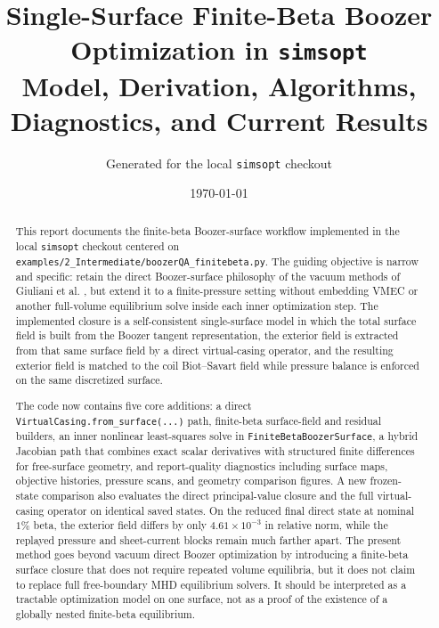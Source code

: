 \documentclass[11pt]{article}
\title{Single-Surface Finite-Beta Boozer Optimization in \texttt{simsopt}\\Model, Derivation, Algorithms, Diagnostics, and Current Results}
\author{Generated for the local \texttt{simsopt} checkout}
\date{\today}
\begin{document}
\maketitle

\begin{abstract}
This report documents the finite-beta Boozer-surface workflow implemented in the local \texttt{simsopt} checkout centered on \texttt{examples/2\_Intermediate/boozerQA\_finitebeta.py}. The guiding objective is narrow and specific: retain the direct Boozer-surface philosophy of the vacuum methods of Giuliani et al. \cite{Giuliani2022,Giuliani2023}, but extend it to a finite-pressure setting without embedding VMEC or another full-volume equilibrium solve inside each inner optimization step. The implemented closure is a self-consistent single-surface model in which the total surface field is built from the Boozer tangent representation, the exterior field is extracted from that same surface field by a direct virtual-casing operator, and the resulting exterior field is matched to the coil Biot--Savart field while pressure balance is enforced on the same discretized surface.

The code now contains five core additions: a direct \texttt{VirtualCasing.from\_surface(...)} path, finite-beta surface-field and residual builders, an inner nonlinear least-squares solve in \texttt{FiniteBetaBoozerSurface}, a hybrid Jacobian path that combines exact scalar derivatives with structured finite differences for free-surface geometry, and report-quality diagnostics including surface maps, objective histories, pressure scans, and geometry comparison figures. A new frozen-state comparison also evaluates the direct principal-value closure and the full virtual-casing operator on identical saved states. On the reduced final direct state at nominal $1\%$ beta, the exterior field differs by only $4.61 \times 10^{-3}$ in relative norm, while the replayed pressure and sheet-current blocks remain much farther apart. The present method goes beyond vacuum direct Boozer optimization by introducing a finite-beta surface closure that does not require repeated volume equilibria, but it does not claim to replace full free-boundary MHD equilibrium solvers. It should be interpreted as a tractable optimization model on one surface, not as a proof of the existence of a globally nested finite-beta equilibrium.
\end{abstract}

\tableofcontents
\newpage
\end{document}
